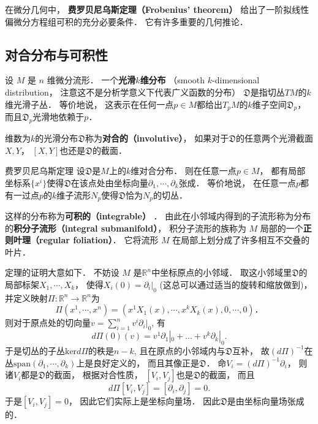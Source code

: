 

在微分几何中， \textbf{费罗贝尼乌斯定理（Frobenius' theorem）} 给出了一阶拟线性偏微分方程组可积的充分必要条件． 它有许多重要的几何推论．

\subsection{对合分布与可积性}
设 $M$ 是 $n$ 维微分流形． 一个\textbf{光滑$k$维分布} （smooth $k$-dimensional distribution， 注意这不是分析学意义下代表广义函数的分布） $\mathfrak{D}$是指切丛$TM$的$k$维光滑子丛． 等价地说， 这表示在任何一点$p\in M$都给出$T_pM$的$k$维子空间$\mathfrak{D}_p$， 而且$\mathfrak{D}_p$光滑地依赖于$p$． 

维数为$k$的光滑分布$\mathfrak{D}$称为\textbf{对合的（involutive）}， 如果对于$\mathfrak{D}$的任意两个光滑截面$X,Y$， $[X,Y]$也还是$\mathfrak{D}$的截面． 

\begin{theorem}{费罗贝尼乌斯定理}
设$\mathfrak{D}$是$M$上的$k$维对合分布． 则在任意一点$p\in M$， 都有局部坐标系$\{x^i\}$使得$\mathfrak{D}$在该点处由坐标向量$\partial_1,\cdots ,\partial_k$张成． 等价地说， 在任意一点$p$都有一过点$p$的$k$维子流形$N_p$使得$\mathfrak{D}$恰为$N_p$的切丛．
\end{theorem}
这样的分布称为\textbf{可积的（integrable）} ． 由此在小邻域内得到的子流形称为分布的\textbf{积分子流形（integral submanifold）}， 积分子流形的族称为 $M$ 局部的一个\textbf{正则叶理（regular foliation）}． 它将流形 $M$ 在局部上划分成了许多相互不交叠的叶片．

定理的证明大意如下． 不妨设 $M$ 是$\mathbb{R}^n$中坐标原点的小邻域． 取这小邻域里$\mathfrak{D}$的局部标架$X_1,\cdots ,X_k$， 使得$X_i(0)=\partial_i|_0$ (这总可以通过适当的旋转和缩放做到)， 并定义映射$\Pi: \mathbb{R}^n\to \mathbb{R}^n$为
$$
\Pi(x^1,\cdots ,x^n)=(x^1X_1(x),\cdots ,x^kX_k(x),0,\cdots ,0)．
$$
则对于原点处的切向量$v=\sum_{i=1}^nv^i\partial_i|_0$, 有
$$
d\Pi(0)(v)=v^1\partial_1|_0+...+v^k\partial_k|_0.
$$
于是切丛的子丛$\text{ker}d\Pi$的秩是$n-k$, 且在原点的小邻域内与$\mathfrak{D}$互补， 故$(d\Pi)^{-1}$在丛$\text{span}(\partial_1,\cdots ,\partial_k)$上是良好定义的， 而且其像正是$\mathfrak{D}$． 命$V_i=(d\Pi)^{-1}\partial_i$， 则诸$V_i$都是$\mathfrak{D}$的截面， 根据对合性质， $[V_i,V_j]$也是$\mathfrak{D}$的截面， 而且
$$
d\Pi[V_i,V_j]=[\partial_i,\partial_j]=0.
$$
于是$[V_i,V_j]=0$， 因此它们实际上是坐标向量场． 因此$\mathfrak{D}$是由坐标向量场张成的． 

